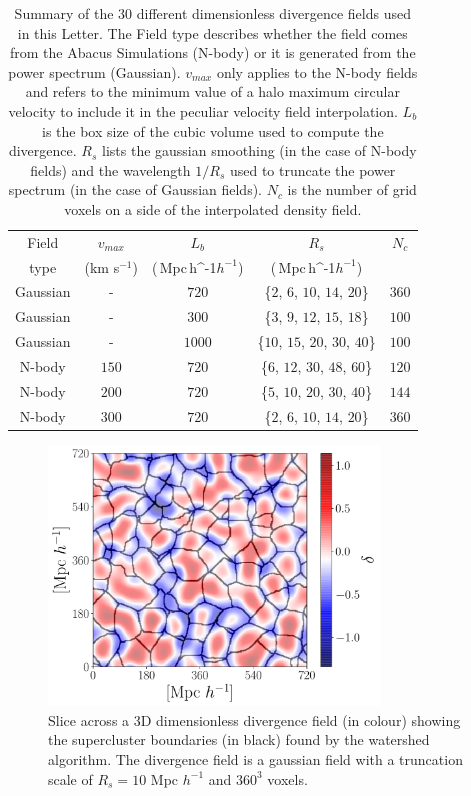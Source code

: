 \documentclass[usenatbib]{mnras}
\newcommand{\Mpch}{\,{\rm Mpc}\,\ifmmode h^{-1}\else $h^{-1}$\fi}
\begin{document}
\begin{table}
\begin{tabular}{c c c c c}\hline
Field &  $v_{max}$ & $L_b$ & $R_s$ & $N_c$\\
type & (km s$^{-1}$) & (\Mpch) & (\Mpch) & \\\hline
Gaussian & - & $720$ & \{$2$, $6$, $10$, $14$, $20$\} & $360$\\
Gaussian & - & $300$ & \{$3$, $9$, $12$, $15$, $18$\} & $100$\\
Gaussian & - & $1000$ & \{$10$, $15$, $20$, $30$, $40$\} & $100$\\
N-body & $150$ & $720$ & \{$6$, $12$, $30$, $48$, $60$\} & $120$\\
N-body & $200$ & $720$ & \{$5$, $10$, $20$, $30$, $40$\} & $144$\\
N-body & $300$ & $720$ & \{$2$, $6$, $10$, $14$, $20$\} & $360$\\\hline
\end{tabular}
\caption{Summary of the $30$ different dimensionless divergence fields used in this Letter. 
The Field type describes whether the field comes from the Abacus Simulations (N-body) or it is generated from the power spectrum (Gaussian). $v_{max}$ only applies to the N-body fields and refers to the minimum value of a halo maximum circular velocity to include it in the peculiar velocity field interpolation.
$L_b$ is the box size of the cubic volume used to compute the divergence. $R_{s}$ lists the gaussian smoothing (in the case of N-body fields) and the wavelength $1/R_s$ used to truncate the power spectrum (in the case of Gaussian fields). $N_c$ is the number of grid voxels on a side of the interpolated density field.}
\label{table:values}
\end{table}


\begin{figure}
    \centering
    \includegraphics[width=250pt]{example_watershed.pdf}
    \caption{Slice across a 3D dimensionless divergence field (in colour) showing the supercluster boundaries (in black) found by the watershed algorithm. 
    The divergence field is a gaussian field with a truncation scale of $R_s=10$ Mpc $h^{-1}$ and $360^3$ voxels.}
    \label{fig:illustration}
\end{figure}
\end{document}
